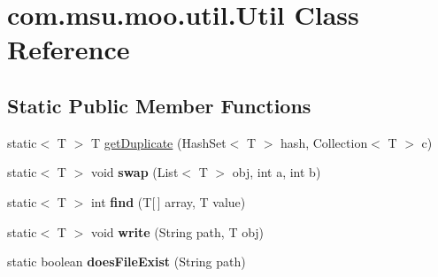 \hypertarget{classcom_1_1msu_1_1moo_1_1util_1_1Util}{\section{com.\-msu.\-moo.\-util.\-Util Class Reference}
\label{classcom_1_1msu_1_1moo_1_1util_1_1Util}
}
\subsection*{Static Public Member Functions}
\begin{DoxyCompactItemize}
\item 
static$<$ T $>$ T \hyperlink{classcom_1_1msu_1_1moo_1_1util_1_1Util_ab8093dfa7dd635eb52b81b6cc1941179}{get\-Duplicate} (Hash\-Set$<$ T $>$ hash, Collection$<$ T $>$ c)
\item 
\hypertarget{classcom_1_1msu_1_1moo_1_1util_1_1Util_a7ebea40c5e0234633ad7d6c88fb4ecbb}{static$<$ T $>$ void {\bfseries swap} (List$<$ T $>$ obj, int a, int b)}\label{classcom_1_1msu_1_1moo_1_1util_1_1Util_a7ebea40c5e0234633ad7d6c88fb4ecbb}

\item 
\hypertarget{classcom_1_1msu_1_1moo_1_1util_1_1Util_afdc09b9107801a36a83967f10f5c913e}{static$<$ T $>$ int {\bfseries find} (T\mbox{[}$\,$\mbox{]} array, T value)}\label{classcom_1_1msu_1_1moo_1_1util_1_1Util_afdc09b9107801a36a83967f10f5c913e}

\item 
\hypertarget{classcom_1_1msu_1_1moo_1_1util_1_1Util_a4ff1666542c7f41000ce3e4cda74faa8}{static$<$ T $>$ void {\bfseries write} (String path, T obj)}\label{classcom_1_1msu_1_1moo_1_1util_1_1Util_a4ff1666542c7f41000ce3e4cda74faa8}

\item 
\hypertarget{classcom_1_1msu_1_1moo_1_1util_1_1Util_acb5752270abc3dd834ce096bbee557a6}{static boolean {\bfseries does\-File\-Exist} (String path)}\label{classcom_1_1msu_1_1moo_1_1util_1_1Util_acb5752270abc3dd834ce096bbee557a6}

\end{DoxyCompactItemize}


